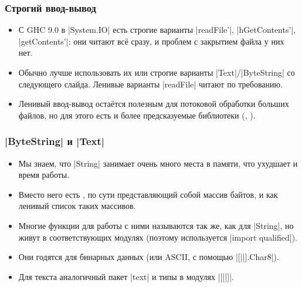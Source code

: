 \documentclass[11pt]{beamer}
\begin{document}
\begin{frame}[fragile]
  \frametitle{Строгий ввод-вывод}
  \begin{itemize}
    \item С GHC 9.0 в \haskinline|System.IO| есть строгие варианты \haskinline|readFile'|, \haskinline|hGetContents'|, \haskinline|getContents'|: они читают всё сразу, и проблем с закрытием файла у них нет.
    \item Обычно лучше использовать их или строгие варианты \haskinline|Text|/\haskinline|ByteString| со следующего слайда. Ленивые варианты \haskinline|readFile| читают по требованию.
    \item Ленивый ввод-вывод остаётся полезным для потоковой обработки больших файлов, но для этого есть и более предсказуемые библиотеки (, ).
  \end{itemize}
\end{frame}

\begin{frame}[fragile]
  \frametitle{\haskinline|ByteString| и \haskinline|Text|}
  \begin{itemize}
    \item Мы знаем, что \haskinline|String| занимает очень много места в памяти, что ухудшает и время работы.
    \item Вместо него есть \href{https://hackage.haskell.org/package/bytestring/docs/Data-ByteString.html}{}, по сути представляющий собой массив байтов, и \href{https://hackage.haskell.org/package/bytestring/docs/Data-ByteString-Lazy.html}{} как ленивый список таких массивов.
    \item Многие функции для работы с ними называются так же, как для \haskinline|String|, но живут в соответствующих модулях (поэтому используется \haskinline|import qualified|).
    \item Они годятся для бинарных данных (или ASCII, с помощью \href{https://hackage.haskell.org/package/bytestring/docs/Data-ByteString-Char8.html}{}\haskinline|[|\href{https://hackage.haskell.org/package/bytestring/docs/Data-ByteString-Lazy-Char8.html}{}\haskinline|].Char8|).
    \item Для текста аналогичный пакет \haskinline|text| и типы в модулях \href{https://hackage.haskell.org/package/text/docs/Data-Text.html}{}\haskinline|[|\href{https://hackage.haskell.org/package/text/docs/Data-Text-Lazy.html}{}\haskinline|]|.
  \end{itemize}
\end{frame}
\end{document}
